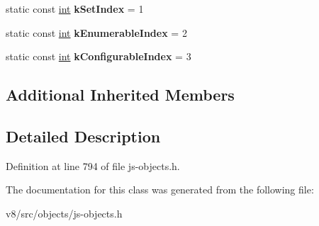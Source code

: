 \begin{DoxyCompactItemize}
static const \mbox{\hyperlink{classint}{int}} {\bfseries k\+Set\+Index} = 1
\item 
\mbox{\label{classv8_1_1internal_1_1JSAccessorPropertyDescriptor_a5fcacb03cc31776efe073fda8bd0eccb}} 
static const \mbox{\hyperlink{classint}{int}} {\bfseries k\+Enumerable\+Index} = 2
\item 
\mbox{\label{classv8_1_1internal_1_1JSAccessorPropertyDescriptor_a7236acacb18e1db4fc0ea9b8ddf94b39}} 
static const \mbox{\hyperlink{classint}{int}} {\bfseries k\+Configurable\+Index} = 3
\end{DoxyCompactItemize}
\subsection*{Additional Inherited Members}


\subsection{Detailed Description}


Definition at line 794 of file js-\/objects.\+h.



The documentation for this class was generated from the following file\+:\begin{DoxyCompactItemize}
\item 
v8/src/objects/js-\/objects.\+h\end{DoxyCompactItemize}

